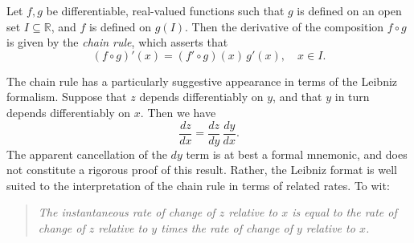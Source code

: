 \documentclass[12pt]{article}
\begin{document}
Let $f, g$ be differentiable,
real-valued functions such that $g$ is defined on an open set 
$I\subseteq \mathbb{R}$, and $f$ is defined on $g(I)$. 
Then the derivative of the composition $f\circ g$ is given by
the \emph{chain rule}, which asserts that
$$
  (f\circ g)'(x) = (f'\circ g)(x)\, g'(x), \quad x\in I.
$$

The chain rule has a particularly suggestive appearance in terms of
the Leibniz formalism.  Suppose that $z$ depends differentiably on
$y$, and that $y$ in turn depends differentiably on $x$.  Then we have
$$
  \frac{dz}{dx} = \frac{dz}{dy}\, \frac{dy}{dx}.
$$
The apparent cancellation  of the $dy$ term is at best a formal
mnemonic, and does not constitute a rigorous proof of this result.
Rather, the Leibniz format is well suited to the interpretation of the
chain rule in terms of related rates. To wit:
\begin{quote}
  \em The instantaneous rate of change of $z$ relative to $x$ is equal to the
  rate of change of $z$ relative to $y$ times the rate of change of
  $y$ relative to $x$.
\end{quote}
\end{document}
